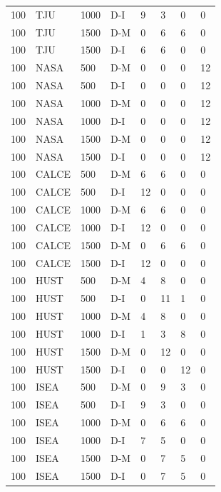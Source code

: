 \documentclass[10pt,a4paper]{article}
\begin{document}
{\begin{longtable}{@{\extracolsep{\fill}}llllllll}
100 & TJU & 1000 & D-I & 9 & 3 & 0 & 0\\
100 & TJU & 1500 & D-M & 0 & 6 & 6 & 0\\
100 & TJU & 1500 & D-I & 6 & 6 & 0 & 0\\
100 & NASA & 500 & D-M & 0 & 0 & 0 & 12\\
100 & NASA & 500 & D-I & 0 & 0 & 0 & 12\\
100 & NASA & 1000 & D-M & 0 & 0 & 0 & 12\\
100 & NASA & 1000 & D-I & 0 & 0 & 0 & 12\\
100 & NASA & 1500 & D-M & 0 & 0 & 0 & 12\\
100 & NASA & 1500 & D-I & 0 & 0 & 0 & 12\\
100 & CALCE & 500 & D-M & 6 & 6 & 0 & 0\\
100 & CALCE & 500 & D-I & 12 & 0 & 0 & 0\\
100 & CALCE & 1000 & D-M & 6 & 6 & 0 & 0\\
100 & CALCE & 1000 & D-I & 12 & 0 & 0 & 0\\
100 & CALCE & 1500 & D-M & 0 & 6 & 6 & 0\\
100 & CALCE & 1500 & D-I & 12 & 0 & 0 & 0\\
100 & HUST & 500 & D-M & 4 & 8 & 0 & 0\\
100 & HUST & 500 & D-I & 0 & 11 & 1 & 0\\
100 & HUST & 1000 & D-M & 4 & 8 & 0 & 0\\
100 & HUST & 1000 & D-I & 1 & 3 & 8 & 0\\
100 & HUST & 1500 & D-M & 0 & 12 & 0 & 0\\
100 & HUST & 1500 & D-I & 0 & 0 & 12 & 0\\
100 & ISEA & 500 & D-M & 0 & 9 & 3 & 0\\
100 & ISEA & 500 & D-I & 9 & 3 & 0 & 0\\
100 & ISEA & 1000 & D-M & 0 & 6 & 6 & 0\\
100 & ISEA & 1000 & D-I & 7 & 5 & 0 & 0\\
100 & ISEA & 1500 & D-M & 0 & 7 & 5 & 0\\
100 & ISEA & 1500 & D-I & 0 & 7 & 5 & 0\\
\end{longtable}}
\end{document}
